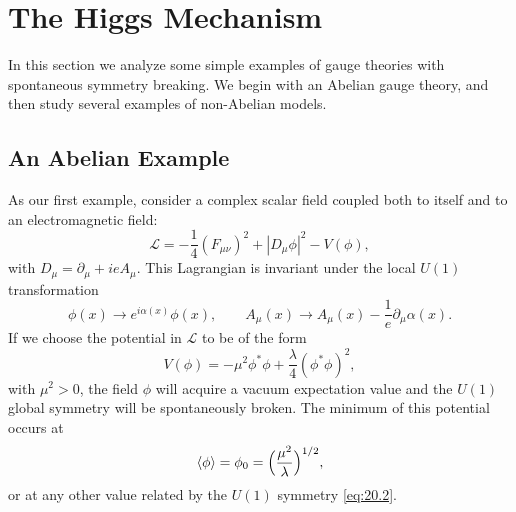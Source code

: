\section{The Higgs Mechanism}

In this section we analyze some simple examples of gauge theories with
spontaneous symmetry breaking.  We begin with an Abelian gauge theory, and
then study several examples of non-Abelian models.

\subsection{An Abelian Example}

As our first example, consider a complex scalar field coupled both to itself
and to an electromagnetic field:
\begin{equation}
  \mathcal{L} = -\frac{1}{4}(F_{\mu\nu})^2 + |D_\mu\phi|^2 - V(\phi),
  \label{eq:20.1}
\end{equation}
with $D_\mu = \partial_\mu + ieA_\mu$.  This Lagrangian is invariant under the
local $U(1)$ transformation
\begin{equation}
  \phi(x) \to e^{i\alpha(x)}\phi(x),\qquad
  A_\mu(x) \to A_\mu(x) - \frac{1}{e}\partial_\mu\alpha(x) .
  \label{eq:20.2}
\end{equation}
If we choose the potential in $\mathcal{L}$ to be of the form
\begin{equation}
  V(\phi) = -\mu^2\phi^{*}\phi + \frac{\lambda}{4}(\phi^{*}\phi)^2 ,
  \label{eq:20.3}
\end{equation}
with $\mu^2 > 0$, the field $\phi$ will acquire a vacuum expectation value and
the $U(1)$ global symmetry will be spontaneously broken.  The minimum of this
potential occurs at
\begin{equation}
  \langle\phi\rangle = \phi_0 = \Bigl( \frac{\mu^2}{\lambda} \Bigr)^{1/2} ,
  \label{eq:20.4}
\end{equation}
or at any other value related by the $U(1)$ symmetry \eqref{eq:20.2}.


